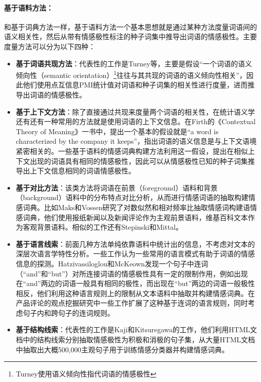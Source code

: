 \paragraph{基于语料方法：}
和基于词典方法一样，基于语料方法一个基本思想就是通过某种方法度量词语间的语义相关性，然后从带有情感极性标注的种子词集中推导出词语的情感极性。主要度量方法可以分为以下四种：
\begin{itemize}
\item \textbf{基于词语共现方法}：代表性的工作是Turney等，主要是假设“一个词语的语义倾向性（semantic orientation）\footnote{Turney使用语义倾向性指代词语的情感极性}往往与其共现的词语的语义倾向性相关”，因此他们使用点互信息PMI统计值对词语和种子词集的相关性进行度量，进而推导出词语的情感极性。
\item \textbf{基于上下文方法}：除了直接通过共现来度量两个词语的相关性，在统计语义学还有还有一种常用的方法就是使用词语的上下文信息。在Firth的《Contextual Theory of Meaning》一书中，提出一个基本的假设就是“a word is characterized by the company it keeps”，指出词语的语义信息是与上下文语境紧密相关的。一些基于语料的情感词典构建方法利用这一假设，提出在相似上下文出现的词语具有相同的情感极性，因此可以从情感极性已知的种子词集推导出上下文信息相同的词语情感极性。
\item \textbf{基于对比方法}：该类方法将词语在前景（foreground）语料和背景（background）语料中的分布特点对比分析，从而进行情感词语的抽取构建情感词典。比如Maks和Vossen研究了对数似然和相对频率比抽取情感词构建语情感词典，他们使用报纸新闻以及新闻评论作为主观前景语料，维基百科文本作为客观背景语料。相似的工作还有Stepinski和Mittal。
\item \textbf{基于语言线索}：前面几种方法单纯依靠语料中统计出的信息，不考虑对文本的深层次语言学特性分析。一些工作认为一些常用的语言模式有助于词语的情感信息的探测。Hatzivassiloglou和McKeown发现一个句子中连词（“and”和“but”）对所连接词语的情感极性具有一定的限制作用，例如出现在“and”两边的词语一般具有相同的极性，而出现在“but”两边的词语一般极性相反，他们利用这种语言规则上的限制从文本语料中抽取并构建情感词典。在产品评论的观点挖掘研究中一些工作扩展了这种基于连词的语言规则，同时考虑句子内和跨句子的连词规则。
\item \textbf{基于结构线索}：代表性的工作是Kaji和Kitsuregawa的工作，他们利用HTML文档中的结构线索分别抽取情感极性为积极和消极的句子集，从大量HTML文档中抽取出大概500,000主观句子用于训练情感分类器并构建情感词典。
\end{itemize}

